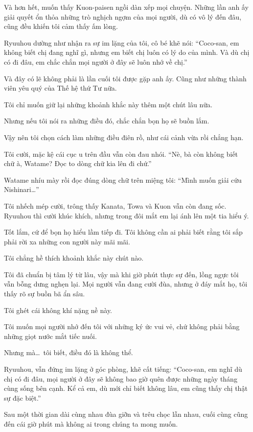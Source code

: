 \documentclass[../main.tex]{subfiles}
\begin{document}
Và hơn hết, muốn thấy Kuon-paisen ngồi dàn xếp mọi chuyện. Những lần anh ấy giải quyết ổn thỏa những trò nghịch ngợm của mọi người, dù có vô lý đến đâu, cũng đều khiến tôi cảm thấy ấm lòng.

Ryuuhou dường như nhận ra sự im lặng của tôi, cô bé khẽ nói: ``Coco-san, em không biết chị đang nghĩ gì, nhưng em biết chị luôn có lý do của mình. Và dù chị có đi đâu, em chắc chắn mọi người ở đây sẽ luôn nhớ về chị.''

Và đây có lẽ không phải là lần cuối tôi được gặp anh ấy. Cũng như những thành viên yêu quý của Thế hệ thứ Tư nữa.

Tôi chỉ muốn giữ lại những khoảnh khắc này thêm một chút lâu nữa.

Nhưng nếu tôi nói ra những điều đó, chắc chắn bọn họ sẽ buồn lắm.

Vậy nên tôi chọn cách làm những điều điên rồ, như cái cảnh vừa rồi chẳng hạn.

Tôi cười, mặc kệ cái cục u trên đầu vẫn còn đau nhói. ``Nè, bà còn không biết chữ à, Watame? Đọc to dòng chữ kia lên đi chứ.''

Watame nhíu mày rồi đọc đúng dòng chữ trên miệng tôi: ``Mình muốn giải cứu Nishinari\dots''

Tôi nhếch mép cười, trông thấy Kanata, Towa và Kuon vẫn còn đang sốc. Ryuuhou thì cười khúc khích, nhưng trong đôi mắt em lại ánh lên một tia hiểu ý.

Tốt lắm, cứ để bọn họ hiểu lầm tiếp đi. Tôi không cần ai phải biết rằng tôi sắp phải rời xa những con người này mãi mãi.

\ct

Tôi chẳng hề thích khoảnh khắc này chút nào.

Tôi đã chuẩn bị tâm lý từ lâu, vậy mà khi giờ phút thực sự đến, lồng ngực tôi vẫn bỗng dưng nghẹn lại. Mọi người vẫn đang cười đùa, nhưng ở đáy mắt họ, tôi thấy rõ sự buồn bã ẩn sâu.

Tôi ghét cái không khí nặng nề này.

Tôi muốn mọi người nhớ đến tôi với những ký ức vui vẻ, chứ không phải bằng những giọt nước mắt tiếc nuối.

Nhưng mà\dots\ tôi biết, điều đó là không thể.

Ryuuhou, vẫn đứng im lặng ở góc phòng, khẽ cất tiếng: ``Coco-san, em nghĩ dù chị có đi đâu, mọi người ở đây sẽ không bao giờ quên được những ngày tháng cùng sống bên cạnh. Kể cả em, dù mới chỉ biết không lâu, em cũng thấy chị thật sự đặc biệt.''

Sau một thời gian dài cùng nhau đùa giỡn và trêu chọc lẫn nhau, cuối cùng cũng đến cái giờ phút mà không ai trong chúng ta mong muốn.
\end{document}
